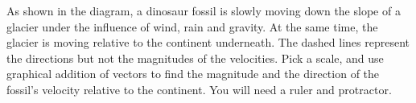As shown in the diagram,
        a dinosaur fossil is slowly moving down the slope of a
        glacier under the influence of wind, rain and gravity. At
        the same time, the glacier is moving relative to the
        continent underneath. The dashed lines represent the
        directions but not the magnitudes of the velocities. Pick a
        scale, and use graphical addition of vectors to find the
        magnitude and the direction of the fossil's velocity
        relative to the continent. You will need a ruler and
        protractor. \answercheck
